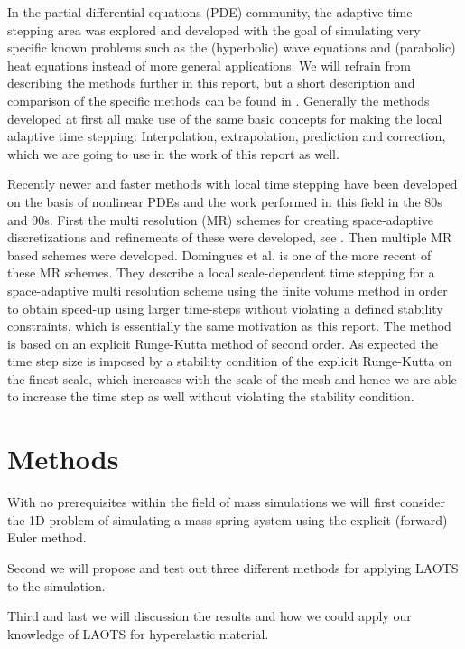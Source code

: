 \documentclass[twoside]{article}
\begin{document}
\begin{multicols}{2}
In the partial differential equations (PDE) community, the adaptive time
stepping area was explored and developed with the goal of simulating
very specific known problems such as the (hyperbolic) wave equations
and (parabolic) heat equations instead of more general applications. We
will refrain from describing the methods further in this report, but a
short description and comparison of the specific methods can be found in
\cite{Gander:2013}. Generally the methods developed at first all make use
of the same basic concepts for making the local adaptive time stepping:
Interpolation, extrapolation, prediction and correction, which we are going to
use in the work of this report as well.

Recently newer and faster methods with local time stepping have been developed
on the basis of nonlinear PDEs and the work performed in this field in
the 80s and 90s. First the multi resolution (MR) schemes for creating
space-adaptive discretizations and refinements of these were developed, see
\cite{Berger:1984}. Then multiple MR based schemes were developed. Domingues
et al. \cite{Domingues:2008} is one of the more recent of these MR schemes.
They describe a local scale-dependent time stepping for a space-adaptive multi
resolution scheme using the finite volume method in order to obtain speed-up
using larger time-steps without violating a defined stability constraints,
which is essentially the same motivation as this report. The method is based
on an explicit Runge-Kutta method of second order. As expected the time step
size is imposed by a stability condition of the explicit Runge-Kutta on the
finest scale, which increases with the scale of the mesh and hence we are able
to increase the time step as well without violating the stability condition.



\section{Methods}

With no prerequisites within the field of mass simulations we will first
consider the 1D problem of simulating a mass-spring system using the explicit
(forward) Euler method.

Second we will propose and test out three different methods for applying LAOTS
to the simulation.

Third and last we will discussion the results and how we could apply our
knowledge of LAOTS for hyperelastic material.


\end{multicols}
\end{document}
